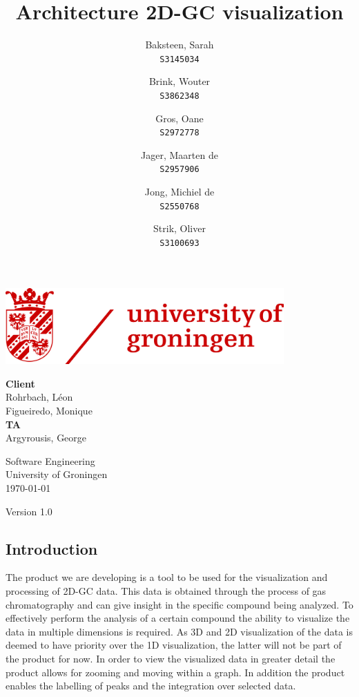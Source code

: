 \documentclass{article}
\title{Architecture 2D-GC visualization}
\author{
  Baksteen, Sarah\\
  \texttt{S3145034}
  \and
  Brink, Wouter\\
  \texttt{S3862348}
  \and
  Gros, Oane\\
  \texttt{S2972778}
  \and
  Jager, Maarten de \\
  \texttt{S2957906}
  \and
  Jong, Michiel de \\
  \texttt{S2550768}
  \and
  Strik, Oliver\\
  \texttt{S3100693}
}
\date{}
\begin{document}
\clearpage
\maketitle
\thispagestyle{empty}
\begin{center}
    \vfill
    \includegraphics[width=0.8\textwidth]{UG_logo.jpg}
    \vfill
    
    \Large
    \textbf{Client} \\
    Rohrbach, Léon \\
    Figueiredo, Monique \\
    
    \vspace{1cm}
    \textbf{TA} \\
    Argyrousis, George
    
    \vspace{2cm}
        Software Engineering \\
        University of Groningen \\
        \today \\
        \empty
        
        \vspace{1cm}
        Version 1.0
\end{center}

\newpage\setcounter{page}{1}
\subsection*{Introduction}

The product we are developing is a tool to be used for the visualization and processing of 2D-GC data. This data is obtained through the process of gas chromatography and can give insight in the specific compound being analyzed. To effectively perform the analysis of a certain compound the ability to visualize the data in multiple dimensions is required. As 3D and 2D visualization of the data is deemed to have priority over the 1D visualization, the latter will not be part of the product for now. In order to view the visualized data in greater detail the product allows for zooming and moving within a graph. In addition the product enables the labelling of peaks and the integration over selected data.
\end{document}
